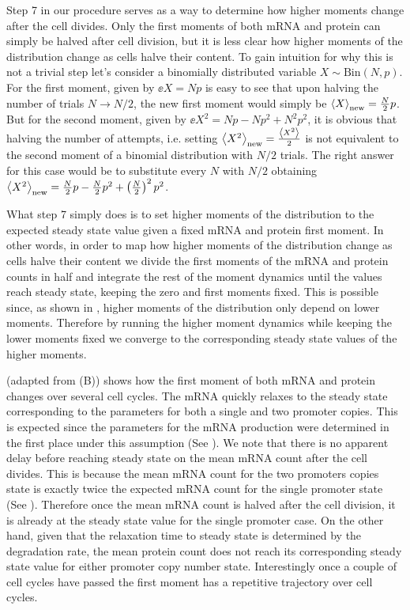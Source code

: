 Step 7 in our procedure serves as a way to determine how higher moments change
after the cell divides. Only the first moments of both mRNA and protein can
simply be halved after cell division, but it is less clear how higher moments of
the distribution change as cells halve their content. To gain intuition for why
this is not a trivial step let's consider a binomially distributed variable $X
\sim \text{Bin}(N, p)$. For the first moment, given by $\ee{X} = Np$ is easy to
see that upon halving the number of trials $N \rightarrow N/2$, the new first
moment would simply be $\left\langle X \right\rangle_{\text{new}} = {N \over 2} p$. But for the second
moment, given by $\ee{X^2} = Np - Np^2 + N^2p^2$, it is obvious that halving the
number of attempts, i.e. setting $\left\langle X^2 \right\rangle_{\text{new}} = {\left\langle X^2 \right\rangle \over 2}$ is
not equivalent to the second moment of a binomial distribution with $N/2$
trials. The right answer for this case would be to substitute every $N$ with
$N/2$ obtaining $\left\langle X^2 \right\rangle_{\text{new}} = {N \over 2}p - {N \over 2}p^2 +
\left({N \over 2}\right)^2p^2$.

What step 7 simply does is to set higher moments of the distribution to the
expected steady state value given a fixed mRNA and protein first moment. In
other words, in order to map how higher moments of the distribution change as
cells halve their content we divide the first moments of the mRNA and protein
counts in half and integrate the rest of the moment dynamics until the values
reach steady state, keeping the zero and first moments fixed. This is possible
since, as shown in , higher moments of the distribution only
depend on lower moments. Therefore by running the higher moment dynamics while
keeping the lower moments fixed we converge to the corresponding steady state
values of the higher moments.

 (adapted from (B)) shows how
the first moment of both mRNA and protein changes over several cell cycles. The
mRNA quickly relaxes to the steady state corresponding to the parameters for
both a single and two promoter copies. This is expected since the parameters for
the mRNA production were determined in the first place under this assumption
(See ). We note that there is no apparent delay before
reaching steady state on the mean mRNA count after the cell divides. This is
because the mean mRNA count for the two promoters copies  state is exactly twice
the expected mRNA count for the single promoter state (See ).
Therefore once the mean mRNA count is halved after the cell division, it is
already at the steady state value for the single promoter case. On the other
hand, given that the relaxation time to steady state is determined by the
degradation rate, the mean protein count does not reach its corresponding steady
state value for either promoter copy number state. Interestingly once a couple
of cell cycles have passed the first moment has a repetitive trajectory over
cell cycles.

